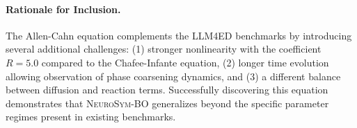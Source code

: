 \documentclass[twoside,11pt]{article}
\newcommand{\1}{{\bf 1}}
\newcommand{\0}{{\bf 0}}
\begin{document}
\paragraph{Rationale for Inclusion.}
The Allen-Cahn equation complements the LLM4ED benchmarks by introducing several additional challenges: (1) stronger nonlinearity with the coefficient $R=5.0$ compared to the Chafee-Infante equation, (2) longer time evolution allowing observation of phase coarsening dynamics, and (3) a different balance between diffusion and reaction terms. Successfully discovering this equation demonstrates that \textsc{NeuroSym-BO} generalizes beyond the specific parameter regimes present in existing benchmarks.


\end{document}
